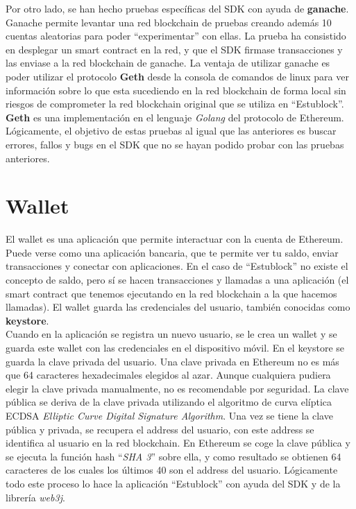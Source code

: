 Por otro lado, se han hecho pruebas específicas del SDK con ayuda de \textbf{ganache}\cite{ganache}. Ganache permite levantar una red blockchain de pruebas creando además 10 cuentas aleatorias para poder ``experimentar'' con ellas. La prueba ha consistido en desplegar un smart contract en la red, y que el SDK firmase transacciones y las enviase a la red blockchain de ganache. La ventaja de utilizar ganache es poder utilizar el protocolo \textbf{Geth} desde la consola de comandos de linux para ver información sobre lo que esta sucediendo en la red blockchain de forma local sin riesgos de comprometer la red blockchain original que se utiliza en ``Estublock''. \textbf{Geth}\cite{geth} es una implementación en el lenguaje \emph{Golang} del protocolo de Ethereum. Lógicamente, el objetivo de estas pruebas al igual que las anteriores es buscar errores, fallos y bugs en el SDK que no se hayan podido probar con las pruebas anteriores.

\section{Wallet} \label{sec:wallet}

El wallet es una aplicación que permite interactuar con la cuenta de Ethereum. Puede verse como una aplicación bancaria, que te permite ver tu saldo, enviar transacciones y conectar con aplicaciones. En el caso de ``Estublock'' no existe el concepto de saldo, pero sí se hacen transacciones y llamadas a una aplicación (el smart contract que tenemos ejecutando en la red blockchain a la que hacemos llamadas). El wallet guarda las credenciales del usuario, también conocidas como \textbf{keystore}. \\

Cuando en la aplicación se registra un nuevo usuario, se le crea un wallet y se guarda este wallet con las credenciales en el dispositivo móvil. En el keystore se guarda la clave privada del usuario. Una clave privada en Ethereum no es más que 64 caracteres hexadecimales elegidos al azar. Aunque cualquiera pudiera elegir la clave privada manualmente, no es recomendable por seguridad. La clave pública se deriva de la clave privada utilizando el algoritmo de curva elíptica ECDSA \emph{Elliptic Curve Digital Signature Algorithm}. Una vez se tiene la clave pública y privada, se recupera el address del usuario, con este address se identifica al usuario en la red blockchain. En Ethereum se coge la clave pública y se ejecuta la función hash ``\emph{SHA 3}'' sobre ella, y como resultado se obtienen 64 caracteres de los cuales los últimos 40 son el address del usuario. Lógicamente todo este proceso lo hace la aplicación ``Estublock'' con ayuda del SDK y de la librería \emph{web3j}. \\

